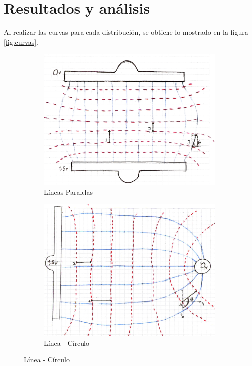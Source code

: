 \documentclass[10pt,twocolumn]{article}
\begin{document}
\section{Resultados y análisis}
Al realizar las curvas para cada distribución, se obtiene lo mostrado en la figura \ref{fig:curvas}.
\begin{figure}
  \centering
  \begin{subfigure}[b]{0.80\linewidth}
    \includegraphics[width=\linewidth]{placas.png}
    \caption{Líneas Paralelas}
  \end{subfigure}
  
  \vspace{8mm}
    \begin{subfigure}[b]{0.80\linewidth}
    \includegraphics[width=\textwidth]{placa-esfera.png}
    \caption{Línea - Círculo}
  \end{subfigure}
  

\end{figure}
\end{document}

